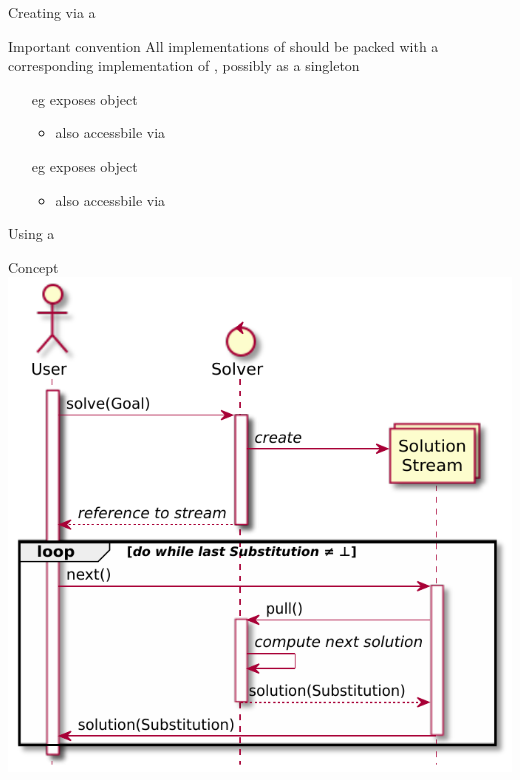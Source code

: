 \documentclass[handout]{beamer}
\begin{document}
\begin{frame}[allowframebreaks]{Creating  via a }
    \framebreak

    \begin{alertblock}{Important convention}\centering
        All implementations of  should be packed with a corresponding implementation of , possibly as a \alert{singleton}
    \end{alertblock}
    \begin{itemize}
        \item[eg]  exposes object 
        \begin{itemize}
            \item also accessbile via 
        \end{itemize}

        \item[eg]  exposes object 
        \begin{itemize}
            \item also accessbile via 
        \end{itemize}
    \end{itemize}

    \framebreak


\end{frame}

\begin{frame}[allowframebreaks]{Using a }

    \begin{block}{Concept}
        \centering
        \includegraphics[width=.4\linewidth]{img/streamful-solver.pdf}
    \end{block}

    \framebreak

\end{frame}
\end{document}
